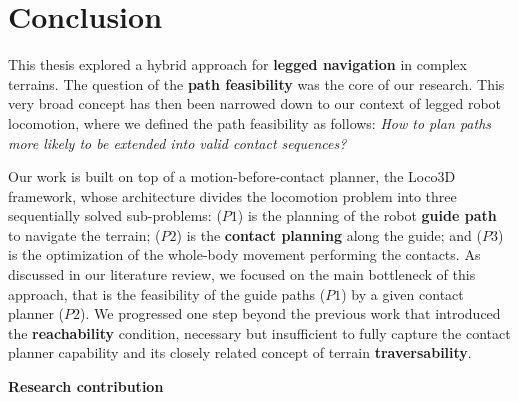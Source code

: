 \chapter{Conclusion}
\label{sec:conclusion}





This thesis explored a hybrid approach for \textbf{legged navigation} in complex terrains.
The question of the \textbf{path feasibility} was the core of our research.
This very broad concept has then been narrowed down to our context of legged robot locomotion, where we defined the path feasibility as follows:
\textit{How to plan paths more likely to be extended into valid contact sequences?}

\hfill \break

Our work is built on top of a motion-before-contact planner, the Loco3D framework, whose architecture divides the locomotion problem into three sequentially solved sub-problems: ($P1$) is the planning of the robot \textbf{guide path} to navigate the terrain; ($P2$) is the \textbf{contact planning} along the guide; and ($P3$) is the optimization of the whole-body movement performing the contacts.
As discussed in our literature review, we focused on the main bottleneck of this approach, that is the feasibility of the guide paths ($P1$) by a given contact planner ($P2$). We progressed one step beyond the previous work \cite{RB-PRM} that introduced the \textbf{reachability} condition, necessary but insufficient to fully capture the contact planner capability and its closely related concept of terrain \textbf{traversability}.

\hfill \break
\hfill \break

\noindent\textbf{Research contribution}\\

